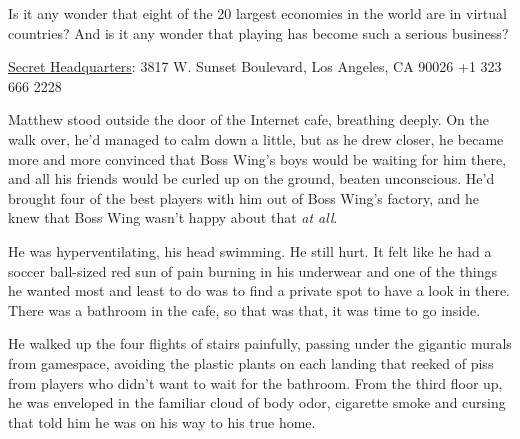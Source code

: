 Is it any wonder that eight of the 20 largest economies in the
world are in virtual countries? And is it any wonder that playing
has become such a serious business?

\tb

{\href{http://www.thesecretheadquarters.com/}{Secret Headquarters}: 3817 W. Sunset Boulevard, Los Angeles, CA 90026 +1 323 666 2228}

Matthew stood outside the door of the Internet cafe, breathing
deeply. On the walk over, he'd managed to calm down a little, but
as he drew closer, he became more and more convinced that Boss
Wing's boys would be waiting for him there, and all his friends
would be curled up on the ground, beaten unconscious. He'd brought
four of the best players with him out of Boss Wing's factory, and
he knew that Boss Wing wasn't happy about that \emph{at all}.

He was hyperventilating, his head swimming. He still hurt. It felt
like he had a soccer ball-sized red sun of pain burning in his
underwear and one of the things he wanted most and least to do was
to find a private spot to have a look in there. There was a
bathroom in the cafe, so that was that, it was time to go inside.

He walked up the four flights of stairs painfully, passing under
the gigantic murals from gamespace, avoiding the plastic plants on
each landing that reeked of piss from players who didn't want to
wait for the bathroom. From the third floor up, he was enveloped in
the familiar cloud of body odor, cigarette smoke and cursing that
told him he was on his way to his true home.

